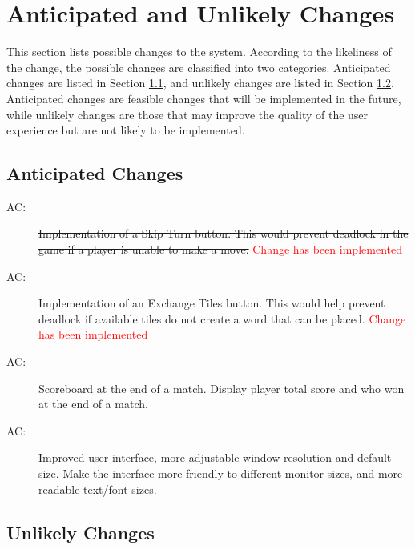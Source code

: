 \documentclass[12pt, titlepage]{article}
\newcounter{acnum}
\newcommand{\actheacnum}{AC\theacnum}
\begin{document}
\section{Anticipated and Unlikely Changes} \label{SecChange} %

This section lists possible changes to the system. According to the likeliness
of the change, the possible changes are classified into two
categories. Anticipated changes are listed in Section \ref{SecAchange}, and
unlikely changes are listed in Section \ref{SecUchange}. Anticipated changes are feasible changes that will be implemented in the future, while unlikely changes are those that may improve the quality of the user experience but are not likely to be implemented.

\subsection{Anticipated Changes} \label{SecAchange}


\begin{description}
\item [ \actheacnum \label{acSkipTurn}:] \sout{Implementation of a Skip Turn button. This would prevent deadlock in the game if a player is unable to make a move. } \textcolor{red}{Change has been implemented}
\item [ \actheacnum \label{acExchangeTile}:] \sout{Implementation of an Exchange Tiles button. This would help prevent deadlock if available tiles do not create a word that can be placed.} \textcolor{red}{Change has been implemented}
\item [ \actheacnum \label{acScoreboard}:] Scoreboard at the end of a match. Display player total score and who won at the end of a match. 
\item [ \actheacnum \label{acGUI}:] Improved user interface, more adjustable window resolution and default size. Make the interface more friendly to different monitor sizes, and more readable text/font sizes.
\end{description}

\subsection{Unlikely Changes} \label{SecUchange}
\end{document}

